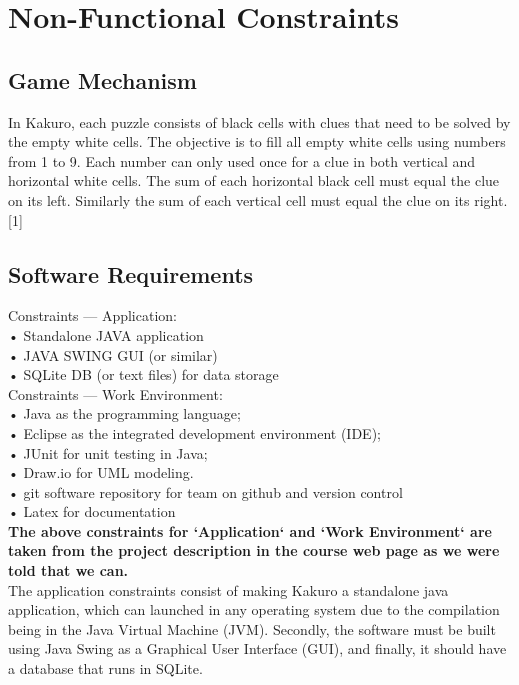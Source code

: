 \documentclass[12pt]{article}
\begin{document}
\newpage

\section{Non-Functional Constraints}

\subsection{Game Mechanism}

In Kakuro, each puzzle consists of black cells with clues that need to be solved by the empty white cells. The objective is to fill all empty white cells using numbers from 1 to 9. Each number can only used once for a clue in both vertical and horizontal white cells. The sum of each horizontal black cell must equal the clue on its left. Similarly the sum of each vertical cell must equal the clue on its right. [1]

\subsection{Software Requirements}
Constraints — Application:\\
• Standalone JAVA application\\
• JAVA SWING GUI (or similar)\\
• SQLite DB (or text files) for data storage\\

Constraints — Work Environment:\\
• Java as the programming language;\\
• Eclipse as the integrated development environment (IDE);\\
• JUnit for unit testing in Java;\\
• Draw.io for UML modeling.\\
• git software repository for team on github and version control\\
• Latex for documentation\\

\textbf{The above constraints for `Application` and `Work Environment` are taken from the project description in the course web page as we were told that we can.} \\

The application constraints consist of making Kakuro a standalone java application, which can launched in any operating system due to the compilation being in the Java Virtual Machine (JVM). Secondly, the software must be built using Java Swing as a Graphical User Interface (GUI), and finally, it should have a database that runs in SQLite. \\
\end{document}
